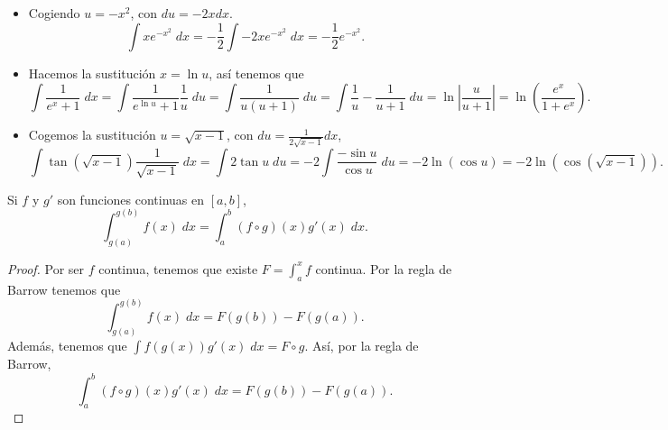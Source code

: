 \begin{eg}
\normalfont 
\begin{itemize}
\item Cogiendo $\displaystyle u = -x^{2} $, con $\displaystyle du = -2xdx $. 
	\[\int xe^{-x^{2}} \; dx = -\frac{1}{2}\int -2xe^{-x^{2}} \; dx = -\frac{1}{2}e^{-x^{2}} .\]
\item Hacemos la sustitución $\displaystyle x = \ln u $, así tenemos que
	\[\int \frac{1}{e^{x}+1} \; dx = \int \frac{1}{e^{\ln u}+1}\frac{1}{u} \; du = \int \frac{1}{u\left(u+1\right)} \; du = \int \frac{1}{u}-\frac{1}{u+1} \; du = \ln \left|\frac{u}{u+1}\right| = \ln\left(\frac{e^{x}}{1+e^{x}}\right).\]
\item Cogemos la sustitución $\displaystyle u = \sqrt{x-1} $, con $\displaystyle du = \frac{1}{2\sqrt{x-1}}dx $,
	\[\int \tan\left(\sqrt{x-1}\right)\frac{1}{\sqrt{x-1}} \; dx = \int 2\tan u \; du = -2\int \frac{-\sin u}{\cos u} \; du = -2\ln\left(\cos u\right)=-2\ln\left(\cos\left(\sqrt{x -1}\right)\right).\]
\end{itemize}
\end{eg}
\begin{ftheorem}
	\normalfont Si $\displaystyle f $ y $\displaystyle g' $ son funciones continuas en $\displaystyle \left[a,b\right]  $, 
\[\int^{g\left(b\right)}_{g\left(a\right)} f\left(x\right) \; dx = \int^{b}_{a} \left(f\circ g\right)\left(x\right)g'\left(x\right) \; dx.\]
\end{ftheorem}
\begin{proof}
Por ser $\displaystyle f $ continua, tenemos que existe $\displaystyle F =  \int^{x}_{a} f $ continua. Por la regla de Barrow tenemos que 
\[\int^{g\left(b\right)}_{g\left(a\right)} f\left(x\right) \; dx = F\left(g\left(b\right)\right)-F\left(g\left(a\right)\right) .\]
Además, tenemos que $\displaystyle \int f\left(g\left(x\right)\right)g'\left(x\right) \; dx = F\circ g $. Así, por la regla de Barrow,
\[\int^{b}_{a} \left(f\circ g\right)\left(x\right)g'\left(x\right) \; dx = F\left(g\left(b\right)\right)-F\left(g\left(a\right)\right).\]
\end{proof}
